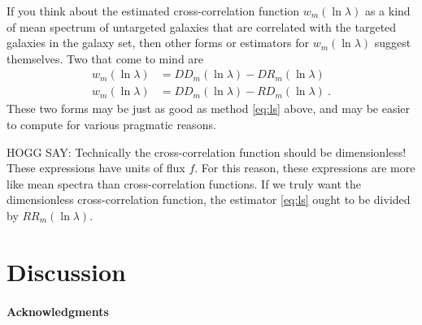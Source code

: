 \documentclass{article}
\begin{document}
If you think about the estimated cross-correlation function $w_m(\ln\lambda)$ as a kind of mean spectrum of untargeted galaxies that are correlated with the targeted galaxies in the galaxy set, then other forms or estimators for $w_m(\ln\lambda)$ suggest themselves.
Two that come to mind are
\begin{align}
    w_m(\ln\lambda) &= DD_m(\ln\lambda) - DR_m(\ln\lambda) \\
    w_m(\ln\lambda) &= DD_m(\ln\lambda) - RD_m(\ln\lambda) ~.
\end{align}
These two forms may be just as good as method \eqref{eq:ls} above, and may be easier to compute for various pragmatic reasons.

HOGG SAY: Technically the cross-correlation function should be dimensionless!
These expressions have units of flux $f$.
For this reason, these expressions are more like mean spectra than cross-correlation functions.
If we truly want the dimensionless cross-correlation function, the estimator \eqref{eq:ls} ought to be divided by $RR_m(\ln\lambda)$.

\section{Discussion}\label{sec:discussion}

\paragraph{Acknowledgments}


\end{document}
